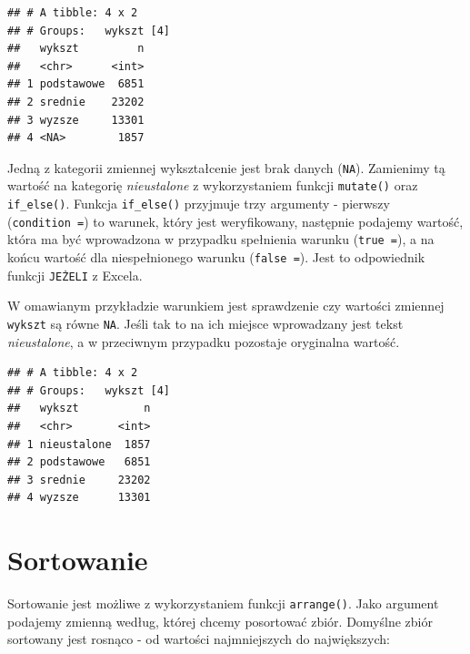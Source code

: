 \documentclass[]{book}
\newenvironment{Shaded}{\begin{snugshade}}{\end{snugshade}}
\newcommand{\KeywordTok}[1]{\textcolor[rgb]{0.13,0.29,0.53}{\textbf{#1}}}
\newcommand{\DataTypeTok}[1]{\textcolor[rgb]{0.13,0.29,0.53}{#1}}
\newcommand{\StringTok}[1]{\textcolor[rgb]{0.31,0.60,0.02}{#1}}
\newcommand{\OperatorTok}[1]{\textcolor[rgb]{0.81,0.36,0.00}{\textbf{#1}}}
\newcommand{\NormalTok}[1]{#1}
\begin{document}
\begin{verbatim}
## # A tibble: 4 x 2
## # Groups:   wykszt [4]
##   wykszt         n
##   <chr>      <int>
## 1 podstawowe  6851
## 2 srednie    23202
## 3 wyzsze     13301
## 4 <NA>        1857
\end{verbatim}

Jedną z kategorii zmiennej wykształcenie jest brak danych (\texttt{NA}).
Zamienimy tą wartość na kategorię \emph{nieustalone} z wykorzystaniem
funkcji \texttt{mutate()} oraz \texttt{if\_else()}. Funkcja
\texttt{if\_else()} przyjmuje trzy argumenty - pierwszy
(\texttt{condition\ =}) to warunek, który jest weryfikowany, następnie
podajemy wartość, która ma być wprowadzona w przypadku spełnienia
warunku (\texttt{true\ =}), a na końcu wartość dla niespełnionego
warunku (\texttt{false\ =}). Jest to odpowiednik funkcji \texttt{JEŻELI}
z Excela.

W omawianym przykładzie warunkiem jest sprawdzenie czy wartości zmiennej
\texttt{wykszt} są równe \texttt{NA}. Jeśli tak to na ich miejsce
wprowadzany jest tekst \emph{nieustalone}, a w przeciwnym przypadku
pozostaje oryginalna wartość.

\begin{Shaded}
\end{Shaded}

\begin{verbatim}
## # A tibble: 4 x 2
## # Groups:   wykszt [4]
##   wykszt          n
##   <chr>       <int>
## 1 nieustalone  1857
## 2 podstawowe   6851
## 3 srednie     23202
## 4 wyzsze      13301
\end{verbatim}

\section{Sortowanie}\label{sortowanie}

Sortowanie jest możliwe z wykorzystaniem funkcji \texttt{arrange()}.
Jako argument podajemy zmienną według, której chcemy posortować zbiór.
Domyślne zbiór sortowany jest rosnąco - od wartości najmniejszych do
największych:
\end{document}
